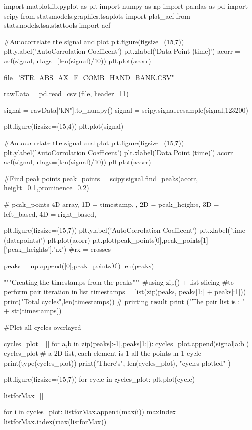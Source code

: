\begin{python}

import matplotlib.pyplot as plt
import numpy as np
import pandas as pd
import scipy
from statsmodels.graphics.tsaplots import plot_acf
from statsmodels.tsa.stattools import acf

#Autocorrelate the signal and plot
plt.figure(figsize=(15,7))
plt.ylabel('AutoCorrolation Coefficent')
plt.xlabel('Data Point (time)')
acorr = acf(signal, nlags=(len(signal)/10))
plt.plot(acorr)

file="STR_ABS_AX_F_COMB_HAND_BANK.CSV"

rawData = pd.read_csv (file, header=11)

signal = rawData["kN"].to_numpy()       
signal = scipy.signal.resample(signal,123200)

plt.figure(figsize=(15,4))
plt.plot(signal)

#Autocorrelate the signal and plot
plt.figure(figsize=(15,7))
plt.ylabel('AutoCorrolation Coefficent')
plt.xlabel('Data Point (time)')
acorr = acf(signal, nlags=(len(signal)/10))
plt.plot(acorr)

#Find peak points
peak_points = scipy.signal.find_peaks(acorr, height=0.1,prominence=0.2)

# peak_points 4D array, 1D = timestamp, , 2D = peak_heights, 3D = left_based, 4D = right_based,

plt.figure(figsize=(15,7))
plt.ylabel('AutoCorrolation Coefficent')
plt.xlabel('time (datapoints)')
plt.plot(acorr)
plt.plot(peak_points[0],peak_points[1]['peak_heights'],'rx') #rx = crosses

peaks = np.append([0],peak_points[0])
len(peaks)

"""Creating the timestamps from the peaks"""
#using zip() + list slicing 
#to perform pair iteration in list
timestamps = list(zip(peaks, peaks[1:] + peaks[:1]))
print("Total cycles",len(timestamps))
# printing result
print ("The pair list is : " + str(timestamps))

#Plot all cycles overlayed

cycles_plot= [] 
for a,b in zip(peaks[:-1],peaks[1:]):
    cycles_plot.append(signal[a:b])
cycles_plot # a 2D list, each element is 1 all the points in 1 cycle
print(type(cycles_plot))
print("There's", len(cycles_plot), "cycles plotted" )

plt.figure(figsize=(15,7))
for cycle in cycles_plot:
    plt.plot(cycle)
    
    
listforMax=[]

for i in cycles_plot:
    listforMax.append(max(i))    
maxIndex = listforMax.index(max(listforMax))


\end{python}

